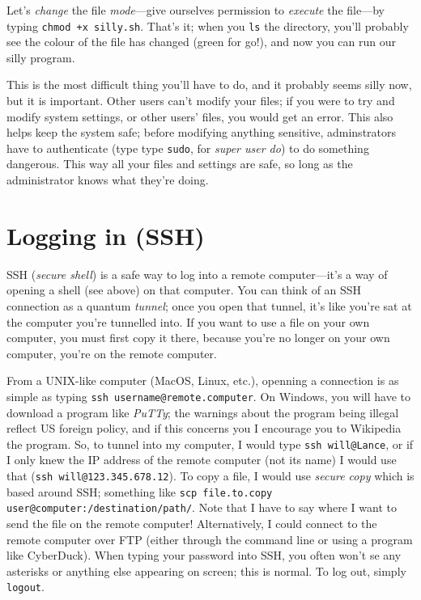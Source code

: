 \documentclass[12pt]{report}
\begin{document}
Let's \emph{change} the file \emph{mode}---give ourselves permission
to \emph{execute} the file---by typing \texttt{chmod +x
  silly.sh}. That's it; when you \texttt{ls} the directory, you'll
probably see the colour of the file has changed (green for go!), and
now you can run our silly program.

This is the most difficult thing you'll have to do, and it probably
seems silly now, but it is important. Other users can't modify your
files; if you were to try and modify system settings, or other users'
files, you would get an error. This also helps keep the system safe;
before modifying anything sensitive, adminstrators have to
authenticate (type type \texttt{sudo}, for \emph{super user do}) to do
something dangerous. This way all your files and settings are safe, so
long as the administrator knows what they're doing.
\section{Logging in (SSH)}
SSH (\emph{secure shell}) is a safe way to log into a remote
computer---it's a way of opening a shell (see above) on that
computer. You can think of an SSH connection as a quantum
\emph{tunnel}; once you open that tunnel, it's like you're sat at the
computer you're tunnelled into. If you want to use a file on your own
computer, you must first copy it there, because you're no longer on
your own computer, you're on the remote computer.

From a UNIX-like computer (MacOS, Linux, etc.), openning a connection
is as simple as typing \texttt{ssh username@remote.computer}. On
Windows, you will have to download a program like \emph{PuTTy}; the
warnings about the program being illegal reflect US foreign policy,
and if this concerns you I encourage you to Wikipedia the program. So,
to tunnel into my computer, I would type \texttt{ssh will@Lance}, or
if I only knew the IP address of the remote computer (not its name) I
would use that (\texttt{ssh will@123.345.678.12}). To copy a file, I
would use \emph{secure copy} which is based around SSH; something like
\texttt{scp file.to.copy user@computer:/destination/path/}. Note that
I have to say where I want to send the file on the remote computer!
Alternatively, I could connect to the remote computer over FTP (either
through the command line or using a program like CyberDuck). When
typing your password into SSH, you often won't se any asterisks or
anything else appearing on screen; this is normal. To log out, simply
\texttt{logout}.
\end{document}
